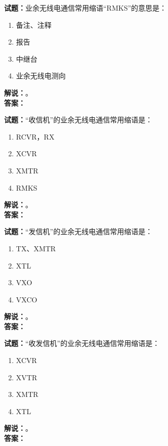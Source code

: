 \documentclass{ctexbook}
\begin{document}
\vspace{\baselineskip}

\noindent\textbf{试题：}业余无线电通信常用缩语“RMKS”的意思是：
\begin{enumerate}[leftmargin=3em]
  \item 备注、注释
  \item 报告
  \item 中继台
  \item 业余无线电测向
\end{enumerate}
\noindent\textbf{解说：}\textbf{}。\\\noindent\textbf{答案：}

\vspace{\baselineskip}

\noindent\textbf{试题：}“收信机”的业余无线电通信常用缩语是：
\begin{enumerate}[leftmargin=3em]
  \item RCVR，RX
  \item XCVR
  \item XMTR
  \item RMKS
\end{enumerate}
\noindent\textbf{解说：}\textbf{}。\\\noindent\textbf{答案：}

\vspace{\baselineskip}

\noindent\textbf{试题：}“发信机”的业余无线电通信常用缩语是：
\begin{enumerate}[leftmargin=3em]
  \item TX、XMTR
  \item XTL
  \item VXO
  \item VXCO
\end{enumerate}
\noindent\textbf{解说：}\textbf{}。\\\noindent\textbf{答案：}

\vspace{\baselineskip}

\noindent\textbf{试题：}“收发信机”的业余无线电通信常用缩语是：
\begin{enumerate}[leftmargin=3em]
  \item XCVR
  \item XVTR
  \item XMTR
  \item XTL
\end{enumerate}
\noindent\textbf{解说：}\textbf{}。\\\noindent\textbf{答案：}
\end{document}
